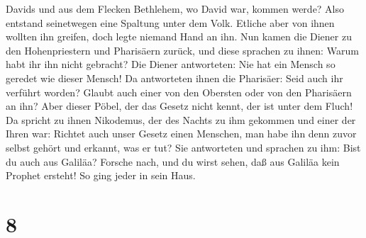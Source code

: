 Davids und aus dem Flecken Bethlehem, wo David war, kommen werde?
 Also entstand seinetwegen eine Spaltung unter dem Volk.
 Etliche aber von ihnen wollten ihn greifen, doch legte
niemand Hand an ihn.  Nun kamen die Diener zu den
Hohenpriestern und Pharisäern zurück, und diese sprachen zu ihnen: Warum
habt ihr ihn nicht gebracht?  Die Diener antworteten: Nie
hat ein Mensch so geredet wie dieser Mensch!  Da
antworteten ihnen die Pharisäer: Seid auch ihr verführt worden?
 Glaubt auch einer von den Obersten oder von den
Pharisäern an ihn?  Aber dieser Pöbel, der das Gesetz
nicht kennt, der ist unter dem Fluch!  Da spricht zu
ihnen Nikodemus, der des Nachts zu ihm gekommen und einer der Ihren war:
 Richtet auch unser Gesetz einen Menschen, man habe ihn
denn zuvor selbst gehört und erkannt, was er tut?  Sie
antworteten und sprachen zu ihm: Bist du auch aus Galiläa? Forsche nach,
und du wirst sehen, daß aus Galiläa kein Prophet ersteht!
 So ging jeder in sein Haus.

\hypertarget{section-7}{%
\section{8}\label{section-7}}

